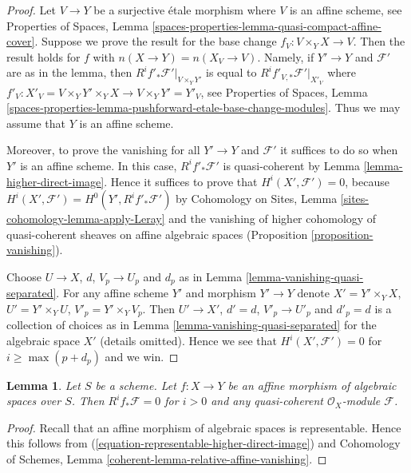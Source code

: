 \documentclass{stacks-project}
\theoremstyle{plain}
\newtheorem{lemma}[subsection]{Lemma}
\theoremstyle{definition}
\theoremstyle{remark}
\numberwithin{equation}{subsection}
\begin{document}
\begin{proof}
Let $V \to Y$ be a surjective \'etale morphism where $V$ is an affine
scheme, see
Properties of Spaces, Lemma
\ref{spaces-properties-lemma-quasi-compact-affine-cover}.
Suppose we prove the result for the base change $f_V : V \times_Y X \to V$.
Then the result holds for $f$ with $n(X \to Y) = n(X_V \to V)$.
Namely, if $Y' \to Y$ and $\mathcal{F}'$ are as in the lemma, then
$R^if'_*\mathcal{F}'|_{V \times_Y Y'}$ is equal to
$R^if'_{V, *}\mathcal{F}'|_{X'_V}$ where
$f'_V : X'_V = V \times_Y Y' \times_Y X \to V \times_Y Y' = Y'_V$, see
Properties of Spaces,
Lemma \ref{spaces-properties-lemma-pushforward-etale-base-change-modules}.
Thus we may assume that $Y$ is an affine scheme.

\medskip\noindent
Moreover, to prove the vanishing for all $Y' \to Y$ and
$\mathcal{F}'$ it suffices to do so when $Y'$ is an affine scheme.
In this case, $R^if'_*\mathcal{F}'$ is quasi-coherent by
Lemma \ref{lemma-higher-direct-image}.
Hence it suffices to prove that $H^i(X', \mathcal{F}') = 0$, because
$H^i(X', \mathcal{F}') = H^0(Y', R^if'_*\mathcal{F}')$ by
Cohomology on Sites, Lemma \ref{sites-cohomology-lemma-apply-Leray}
and the vanishing of higher cohomology of quasi-coherent sheaves
on affine algebraic spaces
(Proposition \ref{proposition-vanishing}).

\medskip\noindent
Choose $U \to X$, $d$, $V_p \to U_p$ and $d_p$ as in
Lemma \ref{lemma-vanishing-quasi-separated}.
For any affine scheme $Y'$ and morphism $Y' \to Y$ denote
$X' = Y' \times_Y X$, $U' = Y' \times_Y U$, $V'_p = Y' \times_Y V_p$.
Then $U' \to X'$, $d' = d$, $V'_p \to U'_p$ and $d'_p = d$
is a collection of choices as in
Lemma \ref{lemma-vanishing-quasi-separated}
for the algebraic space $X'$ (details omitted).
Hence we see that $H^i(X', \mathcal{F}') = 0$ for $i \geq \max(p + d_p)$
and we win.
\end{proof}

\begin{lemma}
\label{lemma-affine-vanishing-higher-direct-images}
Let $S$ be a scheme. Let $f : X \to Y$ be an affine
morphism of algebraic spaces over $S$. Then
$R^if_*\mathcal{F} = 0$ for $i > 0$ and any quasi-coherent
$\mathcal{O}_X$-module $\mathcal{F}$.
\end{lemma}

\begin{proof}
Recall that an affine morphism of algebraic spaces is representable.
Hence this follows from (\ref{equation-representable-higher-direct-image}) and
Cohomology of Schemes, Lemma \ref{coherent-lemma-relative-affine-vanishing}.
\end{proof}
\end{document}
